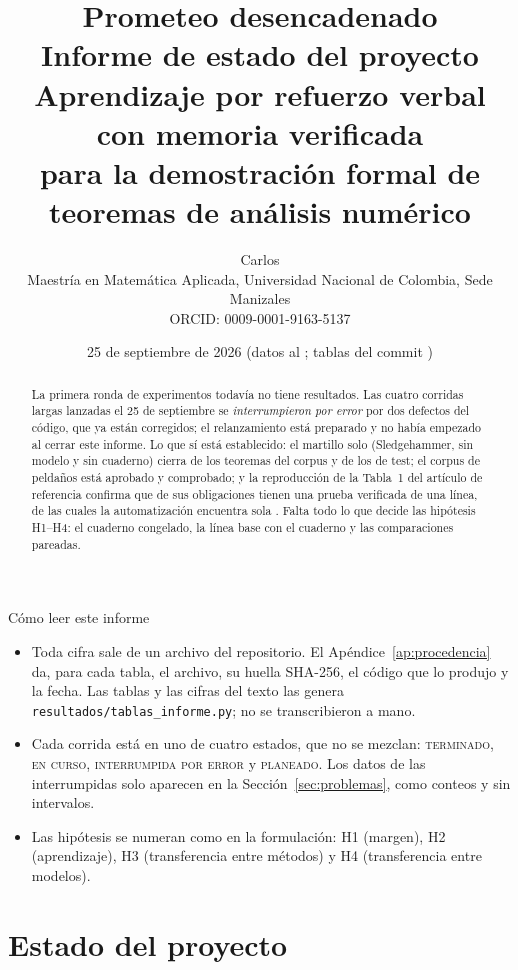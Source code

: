 \documentclass[11pt]{article}
\title{\textbf{Prometeo desencadenado}\\[4pt]
\large Informe de estado del proyecto\\[8pt]
\normalsize Aprendizaje por refuerzo verbal con memoria verificada\\
para la demostración formal de teoremas de análisis numérico}
\author{Carlos\\
\small Maestría en Matemática Aplicada, Universidad Nacional de Colombia, Sede Manizales\\
\small ORCID: 0009-0001-9163-5137}
\date{25 de septiembre de 2026 \quad(datos al \GeneradoDatos; tablas del commit \texttt{\CommitTablas})}
\theoremstyle{remark}
\newcommand{\estado}[1]{\textsc{#1}}
\begin{document}
\maketitle

\begin{abstract}
La primera ronda de experimentos todavía no tiene resultados. Las cuatro corridas largas lanzadas el 25 de septiembre se \emph{interrumpieron por error} por dos defectos del código, que ya están corregidos; el relanzamiento está preparado y no había empezado al cerrar este informe. Lo que sí está establecido: el martillo solo (Sledgehammer, sin modelo y sin cuaderno) cierra \AtodosX{} de los \AtodosN{} teoremas del corpus y \AtestX{} de los \AtestN{} de test; el corpus de \CorpusN{} peldaños está aprobado y comprobado; y la reproducción de la Tabla~1 del artículo de referencia confirma que \TunoUnaLinea{} de sus \TunoVC{} obligaciones tienen una prueba verificada de una línea, de las cuales la automatización encuentra sola \TunoSola. Falta todo lo que decide las hipótesis H1--H4: el cuaderno congelado, la línea base con el cuaderno y las comparaciones pareadas.
\end{abstract}

\begin{recuadro}{Cómo leer este informe}
\begin{itemize}[nosep,leftmargin=*]
\item Toda cifra sale de un archivo del repositorio. El Apéndice~\ref{ap:procedencia} da, para cada tabla, el archivo, su huella SHA-256, el código que lo produjo y la fecha. Las tablas y las cifras del texto las genera \texttt{resultados/tablas\_informe.py}; no se transcribieron a mano.
\item Cada corrida está en uno de cuatro estados, que no se mezclan: \estado{terminado}, \estado{en curso}, \estado{interrumpida por error} y \estado{planeado}. Los datos de las interrumpidas solo aparecen en la Sección~\ref{sec:problemas}, como conteos y sin intervalos.
\item Las hipótesis se numeran como en la formulación: H1 (margen), H2 (aprendizaje), H3 (transferencia entre métodos) y H4 (transferencia entre modelos).
\end{itemize}
\end{recuadro}

\section{Estado del proyecto}\label{sec:estado}
\end{document}
